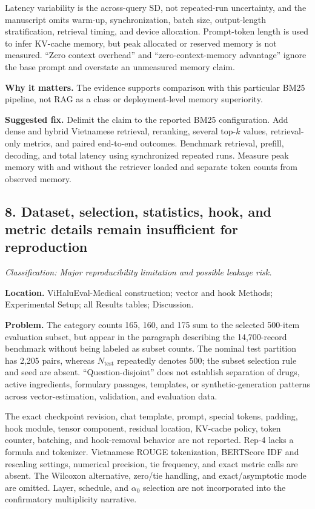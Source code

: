 \documentclass[11pt]{article}
\newcommand{\findinglabel}[1]{\textbf{#1}}
\newcommand{\classification}[1]{\textit{Classification: #1.}}
\begin{document}
Latency variability is the across-query SD, not repeated-run uncertainty, and the manuscript omits warm-up, synchronization, batch size, output-length stratification, retrieval timing, and device allocation.  Prompt-token length is used to infer KV-cache memory, but peak allocated or reserved memory is not measured.  ``Zero context overhead'' and ``zero-context-memory advantage'' ignore the base prompt and overstate an unmeasured memory claim.

\findinglabel{Why it matters.} The evidence supports comparison with this particular BM25 pipeline, not RAG as a class or deployment-level memory superiority.

\findinglabel{Suggested fix.} Delimit the claim to the reported BM25 configuration.  Add dense and hybrid Vietnamese retrieval, reranking, several top-$k$ values, retrieval-only metrics, and paired end-to-end outcomes.  Benchmark retrieval, prefill, decoding, and total latency using synchronized repeated runs.  Measure peak memory with and without the retriever loaded and separate token counts from observed memory.

\subsection*{8. Dataset, selection, statistics, hook, and metric details remain insufficient for reproduction}

\classification{Major reproducibility limitation and possible leakage risk}

\findinglabel{Location.} ViHaluEval-Medical construction; vector and hook Methods; Experimental Setup; all Results tables; Discussion.

\findinglabel{Problem.} The category counts 165, 160, and 175 sum to the selected 500-item evaluation subset, but appear in the paragraph describing the 14,700-record benchmark without being labeled as subset counts.  The nominal test partition has 2,205 pairs, whereas $N_{\text{test}}$ repeatedly denotes 500; the subset selection rule and seed are absent.  ``Question-disjoint'' does not establish separation of drugs, active ingredients, formulary passages, templates, or synthetic-generation patterns across vector-estimation, validation, and evaluation data.

The exact checkpoint revision, chat template, prompt, special tokens, padding, hook module, tensor component, residual location, KV-cache policy, token counter, batching, and hook-removal behavior are not reported.  Rep-4 lacks a formula and tokenizer.  Vietnamese ROUGE tokenization, BERTScore IDF and rescaling settings, numerical precision, tie frequency, and exact metric calls are absent.  The Wilcoxon alternative, zero/tie handling, and exact/asymptotic mode are omitted.  Layer, schedule, and $\alpha_0$ selection are not incorporated into the confirmatory multiplicity narrative.
\end{document}
